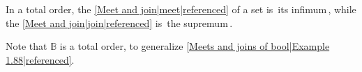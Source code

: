 In a total order, the \ref{Meet and join|meet|referenced} of a set is \,its infimum\,, while the \ref{Meet and join|join|referenced} is \,the supremum\,.

  Note that $\mathbb{B}$ is a total order, to generalize \ref{Meets and joins of bool|Example 1.88|referenced}.